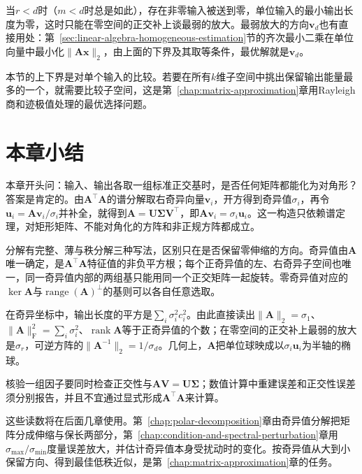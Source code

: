 当$r<d$时（$m<d$时总是如此），存在非零输入被送到零，单位输入的最小输出长度为零，这时只能在零空间的正交补上谈最弱的放大。最弱放大的方向$\bm v_d$也有直接用处：第~\ref{sec:linear-algebra-homogeneous-estimation}节的齐次最小二乘在单位向量中最小化$\lVert\bm A\bm x\rVert_2$，由上面的下界及其取等条件，最优解就是$\bm v_d$。

本节的上下界是对单个输入的比较。若要在所有$k$维子空间中挑出保留输出能量最多的一个，就需要比较子空间，这是第~\ref{chap:matrix-approximation}章用Rayleigh商和迹极值处理的最优选择问题。

\FloatBarrier
\section{本章小结}
\label{sec:svd-chapter-summary}

本章开头问：输入、输出各取一组标准正交基时，是否任何矩阵都能化为对角形？答案是肯定的。由$\bm A^\top\bm A$的谱分解取右奇异向量$\bm v_i$，开方得到奇异值$\sigma_i$，再令$\bm u_i=\bm A\bm v_i/\sigma_i$并补全，就得到$\bm A=\bm U\bm\Sigma\bm V^\top$，即$\bm A\bm v_i=\sigma_i\bm u_i$。这一构造只依赖谱定理，对矩形矩阵、不能对角化的方阵和非正规方阵都成立。

分解有完整、薄与秩分解三种写法，区别只在是否保留零伸缩的方向。奇异值由$\bm A$唯一确定，是$\bm A^\top\bm A$特征值的非负平方根；每个正奇异值的左、右奇异子空间也唯一，同一奇异值内部的两组基只能用同一个正交矩阵一起旋转。零奇异值对应的$\ker\bm A$与$\operatorname{range}(\bm A)^\perp$的基则可以各自任意选取。

在奇异坐标中，输出长度的平方是$\sum_i\sigma_i^2c_i^2$。由此直接读出$\lVert\bm A\rVert_2=\sigma_1$、$\lVert\bm A\rVert_{\mathrm F}^2=\sum_i\sigma_i^2$、$\operatorname{rank}\bm A$等于正奇异值的个数；在零空间的正交补上最弱的放大是$\sigma_r$，可逆方阵的$\lVert\bm A^{-1}\rVert_2=1/\sigma_d$。几何上，$\bm A$把单位球映成以$\sigma_i\bm u_i$为半轴的椭球。

核验一组因子要同时检查正交性与$\bm A\bm V=\bm U\bm\Sigma$；数值计算中重建误差和正交性误差须分别报告，并且不宜通过显式形成$\bm A^\top\bm A$来计算。

这些读数将在后面几章使用。第~\ref{chap:polar-decomposition}章由奇异值分解把矩阵分成伸缩与保长两部分，第~\ref{chap:condition-and-spectral-perturbation}章用$\sigma_{\max}/\sigma_{\min}$度量误差放大，并估计奇异值本身受扰动时的变化。按奇异值从大到小保留方向、得到最佳低秩近似，是第~\ref{chap:matrix-approximation}章的任务。
